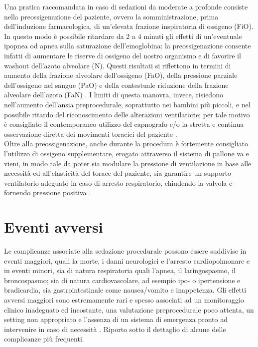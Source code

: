 Una pratica raccomandata in caso di sedazioni da moderate a profonde consiste nella preossigenazione del paziente, ovvero la somministrazione, prima dell'induzione farmacologica, di un'elevata frazione inspiratoria di ossigeno (FiO). In questo modo è possibile ritardare da 2 a 4 minuti gli effetti di un'eventuale ipopnea od apnea sulla saturazione dell'emoglobina: la preossigenazione consente infatti di aumentare le riserve di ossigeno del nostro organismo e di favorire il washout dell'azoto alveolare (N). Questi risultati si riflettono in termini di aumento della frazione alveolare dell'ossigeno (FaO), della pressione parziale dell'ossigeno nel sangue (PaO) e della contestuale riduzione della frazione alveolare dell'azoto (FaN) \cite{Nimmagadda2017}.
I limiti di questa manovra, invece, risiedono nell'aumento dell'ansia preprocedurale, soprattutto nei bambini più piccoli, e nel possibile ritardo del riconoscimento delle alterazioni ventilatorie; per tale motivo è consigliato il contemporaneo utilizzo del capnografo e/o la stretta e continua osservazione diretta dei movimenti toracici del paziente \cite{Fu2004}. 
\\Oltre alla preossigenazione, anche durante la procedura è fortemente consigliato l'utilizzo di ossigeno supplementare, erogato attraverso il sistema di pallone va e vieni, in modo tale da poter sia modulare la pressione di ventilazione in base alle necessità ed all'elasticità del torace del paziente, sia garantire un supporto ventilatorio adeguato in caso di arresto respiratorio, chiudendo la valvola e fornendo pressione positiva \cite{Simeupsedazione}.

\section{Eventi avversi}

Le complicanze associate alla sedazione procedurale possono essere suddivise in eventi maggiori, quali la morte, i danni neurologici e l'arresto cardiopolmonare e in eventi minori, sia di natura respiratoria quali l'apnea, il laringospasmo, il broncospasmo; sia di natura cardiovascolare, ad esempio ipo- o ipertensione e bradicardia, sia gastrointestinale come nausea/vomito e inappetenza. Gli effetti avversi maggiori sono estremamente rari e spesso associati ad un monitoraggio clinico inadeguato ed incostante, una valutazione preprocedurale poco attenta, un setting non appropriato e l'assenza di un sistema di emergenza pronto ad intervenire in caso di necessità \cite{Uptodatesed}.
Riporto sotto il dettaglio di alcune delle complicanze più frequenti.

